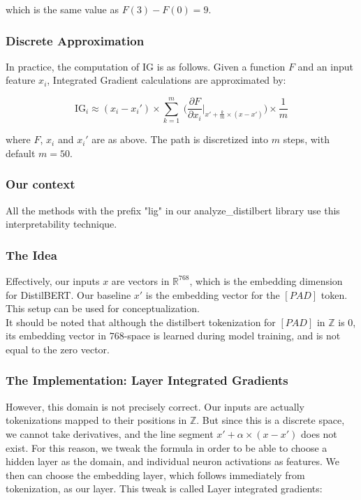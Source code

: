 \documentclass{article}
\begin{document}
\noindent which is the same value as $F(3) - F(0) = 9$.  \\

\subsubsection{Discrete Approximation}

In practice, the computation of IG is as follows.  Given a function $F$ and an input feature $x_i$, Integrated Gradient calculations are approximated by:

\begin{equation}
\text{IG}_i \approx (x_i - x_i') \times \sum_{k=1}^{m} \ \bigg( \frac{\partial F}{\partial x_i} \Big|_{x' + \frac{k}{m} \times (x - x')} \bigg) \times \frac{1}{m}
\end{equation}

\noindent where $F$, $x_i$ and $x_i'$ are as above.  The path is discretized into $m$ steps, with default $m = 50$.


\subsubsection{Our context}

All the methods with the prefix "lig" in our analyze\_distilbert library use this interpretability technique.

\subsubsection*{The Idea}

Effectively, our inputs $x$ are vectors in $\mathbb{R}^{768}$, which is the embedding dimension for DistilBERT.  Our baseline $x'$ is the embedding vector for the $[PAD]$ token.  This setup can be used for conceptualization. \\

It should be noted that although the distilbert tokenization for $[PAD]$ in $\mathbb{Z}$ is $0$, its embedding vector in $768$-space is learned during model training, and is not equal to the zero vector.

\subsubsection*{The Implementation: Layer Integrated Gradients}

However, this domain is not precisely correct.  Our inputs are actually tokenizations mapped to their positions in $\mathbb{Z}$.  But since this is a discrete space, we cannot take derivatives, and the line segment $x' + \alpha \times (x - x')$ does not exist.  For this reason, we tweak the formula in order to be able to choose a hidden layer as the domain, and individual neuron activations as features.  We then can choose the embedding layer, which follows immediately from tokenization, as our layer.  This tweak is called Layer integrated gradients:
\end{document}
